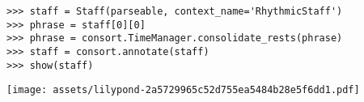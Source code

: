 \begin{comment}
<abjad>
consolidated_staff = Staff(parseable, context_name='RhythmicStaff')
for voice in consolidated_staff:
    for phrase in voice:
        phrase = consort.TimeManager.consolidate_rests(phrase)

consolidated_staff = consort.annotate(consolidated_staff)
staff_group = StaffGroup([unconsolidated_staff, consolidated_staff])
show(staff_group)
</abjad>
\end{comment}

\begin{singlespacing}
\vspace{-0.5\baselineskip}
\begin{lstlisting}
>>> staff = Staff(parseable, context_name='RhythmicStaff')
>>> phrase = staff[0][0]
>>> phrase = consort.TimeManager.consolidate_rests(phrase)
>>> staff = consort.annotate(staff)
>>> show(staff)
\end{lstlisting}
\noindent\texttt{[image: assets/lilypond-2a5729965c52d755ea5484b28e5f6dd1.pdf]}
\end{singlespacing}
